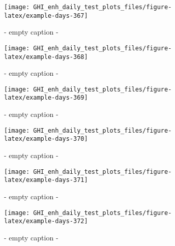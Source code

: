\documentclass[
  10pt,
  a4paper,oneside]{article}
\begin{document}
\begin{figure}[H]

{\centering \texttt{[image: GHI\_enh\_daily\_test\_plots\_files/figure-latex/example-days-367]} 

}

\caption{ - empty caption - }\label{fig:example-days-367}
\end{figure}

\begin{figure}[H]

{\centering \texttt{[image: GHI\_enh\_daily\_test\_plots\_files/figure-latex/example-days-368]} 

}

\caption{ - empty caption - }\label{fig:example-days-368}
\end{figure}

\begin{figure}[H]

{\centering \texttt{[image: GHI\_enh\_daily\_test\_plots\_files/figure-latex/example-days-369]} 

}

\caption{ - empty caption - }\label{fig:example-days-369}
\end{figure}

\begin{figure}[H]

{\centering \texttt{[image: GHI\_enh\_daily\_test\_plots\_files/figure-latex/example-days-370]} 

}

\caption{ - empty caption - }\label{fig:example-days-370}
\end{figure}

\begin{figure}[H]

{\centering \texttt{[image: GHI\_enh\_daily\_test\_plots\_files/figure-latex/example-days-371]} 

}

\caption{ - empty caption - }\label{fig:example-days-371}
\end{figure}

\begin{figure}[H]

{\centering \texttt{[image: GHI\_enh\_daily\_test\_plots\_files/figure-latex/example-days-372]} 

}

\caption{ - empty caption - }\label{fig:example-days-372}
\end{figure}
\end{document}
